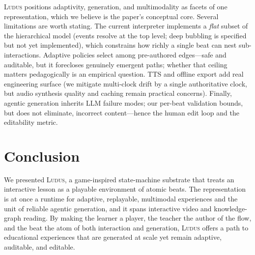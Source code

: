 \documentclass[sigconf,review,anonymous]{acmart}
\newcommand{\sys}{\textsc{Ludus}\xspace}
\begin{document}
\sys{} positions adaptivity, generation, and multimodality as facets of one
representation, which we believe is the paper's conceptual core. Several
limitations are worth stating. The current interpreter implements a \emph{flat}
subset of the hierarchical model (events resolve at the top level; deep bubbling
is specified but not yet implemented), which constrains how richly a single beat
can nest sub-interactions. Adaptive policies select among pre-authored
edges---safe and auditable, but it forecloses genuinely emergent paths; whether
that ceiling matters pedagogically is an empirical question. TTS and offline
export add real engineering surface (we mitigate multi-clock drift by a single
authoritative clock, but audio synthesis quality and caching remain practical
concerns). Finally, agentic generation inherits LLM failure modes; our per-beat
validation bounds, but does not eliminate, incorrect content---hence the human
edit loop and the editability metric.

\section{Conclusion}

We presented \sys, a game-inspired state-machine substrate that treats an
interactive lesson as a playable environment of atomic beats. The representation
is at once a runtime for adaptive, replayable, multimodal experiences and the
unit of reliable agentic generation, and it spans interactive video and
knowledge-graph reading. By making the learner a player, the teacher the author
of the flow, and the beat the atom of both interaction and generation, \sys{}
offers a path to educational experiences that are generated at scale yet remain
adaptive, auditable, and editable.



\end{document}
